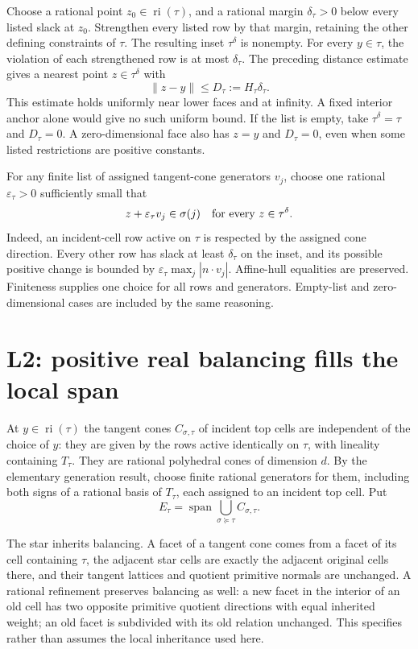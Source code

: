\documentclass[
  11pt,
]{article}
\begin{document}
Choose a rational point \(z_0\in\operatorname{ri}(\tau)\), and a
rational margin \(\delta_\tau>0\) below every listed slack at \(z_0\).
Strengthen every listed row by that margin, retaining the other defining
constraints of \(\tau\). The resulting inset \(\tau^\delta\) is
nonempty. For every \(y\in\tau\), the violation of each strengthened row
is at most \(\delta_\tau\). The preceding distance estimate gives a
nearest point \(z\in\tau^\delta\) with
\[ \|z-y\|\leq D_\tau:=H_\tau\delta_\tau. \] This estimate holds
uniformly near lower faces and at infinity. A fixed interior anchor
alone would give no such uniform bound. If the list is empty, take
\(\tau^\delta=\tau\) and \(D_\tau=0\). A zero-dimensional face also has
\(z=y\) and \(D_\tau=0\), even when some listed restrictions are
positive constants.

For any finite list of assigned tangent-cone generators \(v_j\), choose
one rational \(\varepsilon_\tau>0\) sufficiently small that
\[ z+\varepsilon_\tau v_j\in\sigma(j)
\quad\hbox{for every }z\in\tau^\delta.
\] Indeed, an incident-cell row active on \(\tau\) is respected by the
assigned cone direction. Every other row has slack at least
\(\delta_\tau\) on the inset, and its possible positive change is
bounded by \(\varepsilon_\tau\max_j|n\cdot v_j|\). Affine-hull
equalities are preserved. Finiteness supplies one choice for all rows
and generators. Empty-list and zero-dimensional cases are included by
the same reasoning.

\section{L2: positive real balancing fills the local
span}\label{l2-positive-real-balancing-fills-the-local-span}

At \(y\in\operatorname{ri}(\tau)\) the tangent cones \(C_{\sigma,\tau}\)
of incident top cells are independent of the choice of \(y\): they are
given by the rows active identically on \(\tau\), with lineality
containing \(T_\tau\). They are rational polyhedral cones of dimension
\(d\). By the elementary generation result, choose finite rational
generators for them, including both signs of a rational basis of
\(T_\tau\), each assigned to an incident top cell. Put
\[ E_\tau=\operatorname{span}\bigcup_{\sigma\succeq\tau} C_{\sigma,\tau}. \]

The star inherits balancing. A facet of a tangent cone comes from a
facet of its cell containing \(\tau\), the adjacent star cells are
exactly the adjacent original cells there, and their tangent lattices
and quotient primitive normals are unchanged. A rational refinement
preserves balancing as well: a new facet in the interior of an old cell
has two opposite primitive quotient directions with equal inherited
weight; an old facet is subdivided with its old relation unchanged. This
specifies rather than assumes the local inheritance used here.
\end{document}
